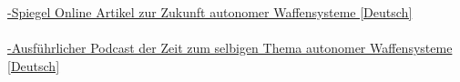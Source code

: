 \documentclass[a4paper,11pt]{article}
\begin{document}
\\ \\ \href{https://www.spiegel.de/wissenschaft/technik/autonome-waffen-ausser-kontrolle-a-1253320.html}{-Spiegel Online Artikel zur Zukunft autonomer Waffensysteme [Deutsch]} \\ \\ \href{https://www.zeit.de/digital/internet/2019-04/kriegssysteme-autonome-waffen-digitalisierung-wird-das-was-digitalpodcast}{-Ausführlicher Podcast der Zeit zum selbigen Thema autonomer Waffensysteme [Deutsch]}
 
\end{document}
